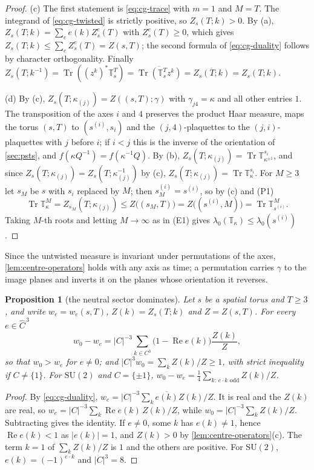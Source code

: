 \documentclass[11pt,a4paper]{amsart}
\newtheorem{proposition}[theorem]{Proposition}
\theoremstyle{definition}
\theoremstyle{remark}
\numberwithin{equation}{section}
\DeclareMathOperator{\Tr}{Tr}        %
\newcommand{\abs}[1]{\lvert #1\rvert}      %
\newcommand{\SU}{\mathrm{SU}}              %
\newcommand{\TT}{\mathbb{T}}               %
\newcommand{\Zpart}[2]{Z(#1,#2)}           %
\newcommand{\lzero}{\lambda_0}             %
\begin{document}
\begin{proof}
(c) The first statement is \eqref{eq:cg-trace} with $m=1$ and $M=T$. The integrand of \eqref{eq:cg-twisted} is strictly positive, so $Z_s(T;k)>0$. By (a), $Z_s(T;k)=\sum_ee(k)Z^e_s(T)$ with $Z^e_s(T)\ge0$, which gives $Z_s(T;k)\le\sum_eZ^e_s(T)=\Zpart{s}{T}$; the second formula of \eqref{eq:cg-duality} follows by character orthogonality. Finally $Z_s(T;k^{-1})=\Tr((z^k)^*\TT_s^T)=\overline{\Tr(\TT_s^Tz^k)}=\overline{Z_s(T;k)}=Z_s(T;k)$.

(d) By (c), $Z_s(T;\kappa_{(j)})=Z((s,T);\gamma)$ with $\gamma_{j4}=\kappa$ and all other entries $1$. The transposition of the axes $i$ and $4$ preserves the product Haar measure, maps the torus $(s,T)$ to $(s^{(i)},s_i)$ and the $(j,4)$-plaquettes to the $(j,i)$-plaquettes with $j$ before $i$; if $i<j$ this is the inverse of the orientation of \cref{sec:psts}, and $f(\kappa Q^{-1})=f(\kappa^{-1}Q)$. By (b), $Z_s(T;\kappa_{(j)})=\Tr\TT_{\kappa^{\pm1}}^{s_i}$, and since $Z_s(T;\kappa_{(j)})=Z_s(T;\kappa^{-1}_{(j)})$ by (c), $Z_s(T;\kappa_{(j)})=\Tr\TT_\kappa^{s_i}$. For $M\ge3$ let $s_M$ be $s$ with $s_i$ replaced by $M$; then $s_M^{(i)}=s^{(i)}$, so by (c) and (P1)
\[
\Tr\TT_\kappa^M=Z_{s_M}(T;\kappa_{(j)})\le Z\bigl((s_M,T)\bigr)=Z\bigl((s^{(i)},M)\bigr)=\Tr\TT_{s^{(i)}}^M .
\]
Taking $M$-th roots and letting $M\to\infty$ as in (E1) gives $\lzero(\TT_\kappa)\le\lzero(s^{(i)})$.
\end{proof}

Since the untwisted measure is invariant under permutations of the axes, \cref{lem:centre-operators} holds with any axis as time; a permutation carries $\gamma$ to the image planes and inverts it on the planes whose orientation it reverses.

\begin{proposition}[the neutral sector dominates]\label{prop:sector-zero}
Let $s$ be a spatial torus and $T\ge3$, and write $w_e=w_e(s,T)$, $Z(k)=Z_s(T;k)$ and $Z=\Zpart{s}{T}$. For every $e\in\widehat C^{\,3}$
\[
w_0-w_e=\abs{C}^{-3}\sum_{k\in C^3}\bigl(1-\operatorname{Re}e(k)\bigr)\frac{Z(k)}{Z},
\]
so that $w_0>w_e$ for $e\ne0$; and $\abs{C}^3w_0=\sum_kZ(k)/Z\ge1$, with strict inequality if $C\ne\{1\}$. For $\SU(2)$ and $C=\{\pm1\}$, $w_0-w_e=\frac14\sum_{k:\,e\cdot k\text{ odd}}Z(k)/Z$.
\end{proposition}

\begin{proof}
By \eqref{eq:cg-duality}, $w_e=\abs{C}^{-3}\sum_k\overline{e(k)}Z(k)/Z$. It is real and the $Z(k)$ are real, so $w_e=\abs{C}^{-3}\sum_k\operatorname{Re}e(k)\,Z(k)/Z$, while $w_0=\abs{C}^{-3}\sum_kZ(k)/Z$. Subtracting gives the identity. If $e\ne0$, some $k$ has $e(k)\ne1$, hence $\operatorname{Re}e(k)<1$ as $\abs{e(k)}=1$, and $Z(k)>0$ by \cref{lem:centre-operators}\textup{(c)}. The term $k=1$ of $\sum_kZ(k)/Z$ is $1$ and the others are positive. For $\SU(2)$, $e(k)=(-1)^{e\cdot k}$ and $\abs{C}^3=8$.
\end{proof}
\end{document}
